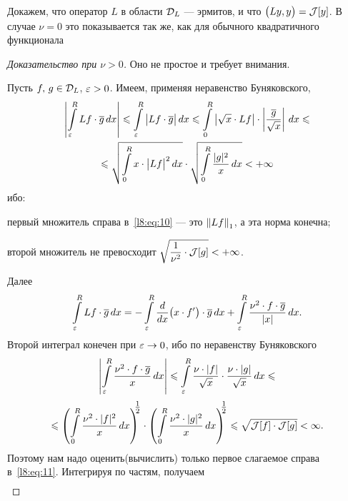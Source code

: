 Докажем, что оператор $L$ в области $\mathcal{D}_L$ --- эрмитов, и что $\big(Ly,y\big)\?=\J[y]$. В случае $\nu=0$ это показывается так же, как для обычного квадратичного функционала
\begin{proof}[Доказательство при $\nu>0$]
	Оно не простое и требует внимания.
	
	Пусть $f,\,g\in\mathcal{D}_L$, $\varepsilon>0$. Имеем, применяя неравенство Буняковского,
	\begin{multline}\label{l8:eq:10}
		\left|\int\limits_{\varepsilon}^R Lf\cdot\overline{g}\,dx\right|\leqslant\int\limits_{\varepsilon}^R\big|Lf\cdot\overline{g}\big|\,dx\leqslant\int\limits_{0}^R\big|\sqrt{x}\cdot Lf\big|\cdot\left|\frac{\overline{g}}{\sqrt{x}}\right|\,dx\leqslant\\\leqslant\sqrt{\int\limits_{0}^R x\cdot\big|Lf\big|^2\,dx}\cdot\sqrt{\int\limits_{0}^R \frac{|g|^2}{x}\,dx}<+\infty
	\end{multline}
	ибо:
	\begin{enumeraterm}
		\item первый множитель справа в~\eqref{l8:eq:10} --- это $\left\|Lf\right\|_1$, а эта норма конечна;
		\item второй множитель не превосходит $\sqrt{\dfrac{1}{\nu^2}\cdot\mathcal{J}[g]}<+\infty$.
	\end{enumeraterm}
	Далее
	\begin{equation}\label{l8:eq:11}
		\int\limits_{\varepsilon}^R Lf\cdot\overline{g}\,dx=-\int\limits_{\varepsilon}^R\frac{d}{dx}\big(x\cdot f'\big)\cdot\overline{g}\,dx+\int\limits_{\varepsilon}^R\frac{\nu^2\cdot f\cdot\overline{g}}{|x|}\,dx.
	\end{equation}
	Второй интеграл конечен при $\varepsilon\to0$, ибо по неравенству Буняковского
	\begin{multline*}
		\left|\int\limits_{\varepsilon}^R\frac{\nu^2\cdot f\cdot\overline{g}}{x}\,dx\right|\leqslant\int\limits_{\varepsilon}^R\frac{\nu\cdot|f|}{\sqrt{x}}\cdot\frac{\nu\cdot|g|}{\sqrt{x}}\,dx\leqslant\\
	\end{multline*}
	\begin{multline}\label{l8:eq:12}
		\hfill\leqslant\left(\int\limits_{0}^R\frac{\nu^2\cdot|f|^2}{x}\,dx\right)^{\!\!\!\textstyle\frac{1}{2}}\cdot\left(\int\limits_{0}^R\frac{\nu^2\cdot|g|^2}{x}\,dx\right)^{\!\!\!\textstyle\frac{1}{2}}	\leqslant\sqrt{\J[f]\cdot\J[g]}<\infty.
	\end{multline}
	Поэтому нам надо оценить(вычислить) только первое слагаемое справа в~\eqref{l8:eq:11}. Интегрируя по частям, получаем
	\begin{multline}\label{l8:eq:13}

\end{multline}
\end{proof}
